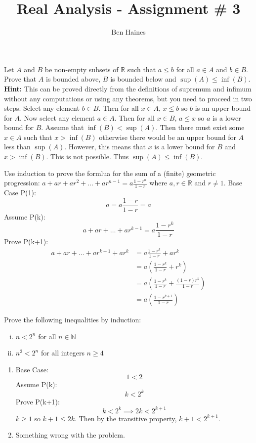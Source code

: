 \documentclass[paper=a4, fontsize=11pt]{jhwhw} %
\begin{document}
\title{Real Analysis - Assignment \# 3}
\author{Ben Haines}

Let $A$ and $B$ be non-empty subsets of $\mathbb R$ such that $a\le b$ for all $a\in A$ and $b\in B$. Prove that $A$ is bounded above, $B$ is bounded below and $\sup(A)\le \inf(B)$. \textbf{Hint: }This can be proved directly from the definitions of supremum and infimum without any computations or using any theorems, but you need to proceed in two steps.
\solution
Select any element $b\in B$. Then for all $x\in A$, $x\le b$ so $b$ is an upper bound for $A$. Now select any element $a\in A$. Then for all $x\in B$, $a \le x$ so $a$ is a lower bound for $B$. Assume that $\inf(B) < \sup(A)$. Then there must exist some $x\in A$ such that $x> \inf(B)$ otherwise there would be an upper bound for $A$ less than $\sup(A)$. However, this means that $x$ is a lower bound for $B$ and $x > \inf(B)$. This is not possible. Thus $\sup(A) \le \inf(B)$. 

Use induction to prove the formlua for the sum of a (finite) geometric progression: $a + ar + ar^2 + \ldots + ar^{n-1} = a\frac{1-r^n}{1-r}$ where $a,r \in \mathbb R$ and $r\not= 1$.
\solution
Base Case P(1):
$$a = a\frac{1-r}{1-r} = a$$
Assume P(k):
$$a + ar + \ldots + ar^{k-1} = a\frac{1-r^k}{1-r}$$
Prove P(k+1):
\begin{align*}
    a + ar + \ldots + ar^{k-1} + ar^k &= a\frac{1-r^k}{1-r} + ar^k\\
                                      &= a\left(\frac{1-r^k}{1-r} + r^k\right)\\
                                      &= a\left(\frac{1-r^k}{1-r} + \frac{(1-r)r^k}{1-r}\right)\\
                                      &= a\left(\frac{1-r^{k+1}}{1-r}\right)
\end{align*}


Prove the following inequalities by induction:
\begin{enumerate}[(i)]
    \item $n < 2^n$ for all $n\in \mathbb N$
    \item $n^2 < 2^n$ for all integers $n\ge 4$ 
\end{enumerate}
\solution
\begin{enumerate}[i]
    \item 
        Base Case:
        $$1 < 2$$
        Assume P(k):
        $$k < 2^k$$
        Prove P(k+1):
        $$k < 2^k \implies 2k < 2^{k+1}$$
        $k\ge 1$ so $k+1 \le 2k$. Then by the transitive property, $k+1 < 2^{k+1}$.
    \item 
        Something wrong with the problem.
\end{enumerate}
\end{document}

